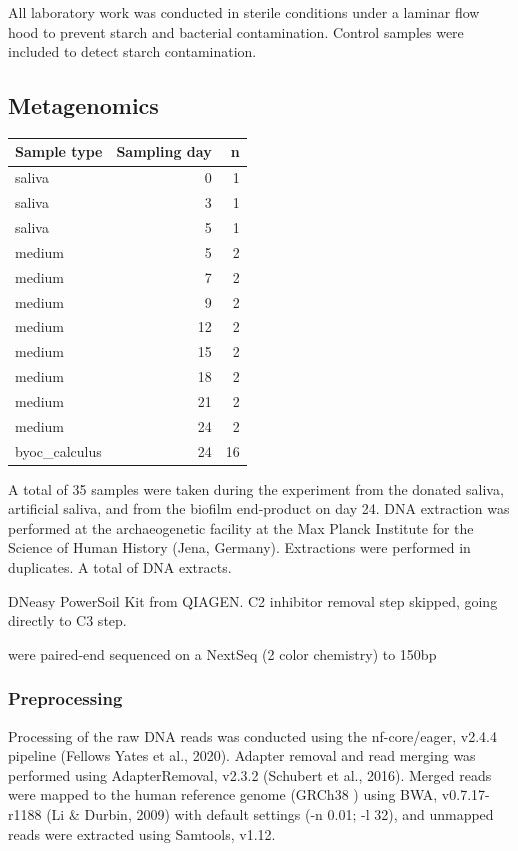 \documentclass[
]{article}
\begin{document}
All laboratory work was conducted in sterile conditions under a laminar
flow hood to prevent starch and bacterial contamination. Control samples
were included to detect starch contamination.

\hypertarget{metagenomics}{%
\subsection{Metagenomics}\label{metagenomics}}

\begin{longtable}[]{@{}lrr@{}}
\toprule()
Sample type & Sampling day & n \\
\midrule()
\endhead
saliva & 0 & 1 \\
saliva & 3 & 1 \\
saliva & 5 & 1 \\
medium & 5 & 2 \\
medium & 7 & 2 \\
medium & 9 & 2 \\
medium & 12 & 2 \\
medium & 15 & 2 \\
medium & 18 & 2 \\
medium & 21 & 2 \\
medium & 24 & 2 \\
byoc\_calculus & 24 & 16 \\
\bottomrule()
\end{longtable}

A total of 35 samples were taken during the experiment from the donated
saliva, artificial saliva, and from the biofilm end-product on day 24.
DNA extraction was performed at the archaeogenetic facility at the Max
Planck Institute for the Science of Human History (Jena, Germany).
Extractions were performed in duplicates. A total of DNA extracts.

DNeasy PowerSoil Kit from QIAGEN. C2 inhibitor removal step skipped,
going directly to C3 step.

were paired-end sequenced on a NextSeq (2 color chemistry) to 150bp

\hypertarget{preprocessing}{%
\subsubsection{Preprocessing}\label{preprocessing}}

Processing of the raw DNA reads was conducted using the nf-core/eager,
v2.4.4 pipeline (Fellows Yates et al., 2020). Adapter removal and read
merging was performed using AdapterRemoval, v2.3.2 (Schubert et al.,
2016). Merged reads were mapped to the human reference genome (GRCh38 )
using BWA, v0.7.17-r1188 (Li \& Durbin, 2009) with default settings (-n
0.01; -l 32), and unmapped reads were extracted using Samtools, v1.12.
\end{document}
